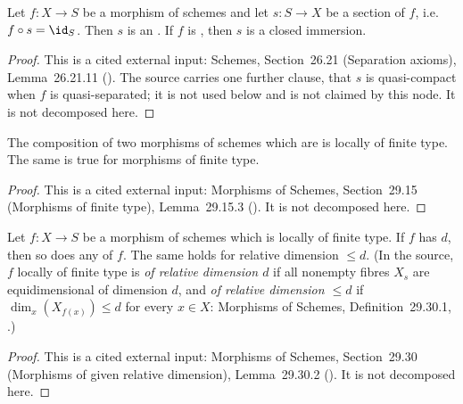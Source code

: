 \begin{lemma}
\label{lem:pc-section-closed-immersion}
Let $f:X\to S$ be a morphism of schemes and let $s:S\to X$ be a section
of $f$, i.e.\ $f\circ s=\id_S$.  Then $s$ is an
.  If $f$ is
, then $s$ is a closed
immersion.
\end{lemma}
\begin{proof}
This is a cited external input: Schemes, Section~26.21 (Separation
axioms), Lemma~26.21.11 ().  The source carries one
further clause, that $s$ is quasi-compact when $f$ is quasi-separated;
it is not used below and is not claimed by this node.  It is not
decomposed here.
\end{proof}

\begin{lemma}
\label{lem:pc-finite-type-composition}
The composition of two morphisms of schemes which are
 is locally of
finite type.  The same is true for morphisms of finite type.
\end{lemma}
\begin{proof}
This is a cited external input: Morphisms of Schemes, Section~29.15
(Morphisms of finite type), Lemma~29.15.3 ().  It is not
decomposed here.
\end{proof}

\begin{lemma}
\label{lem:pc-relative-dimension-base-change}
Let $f:X\to S$ be a morphism of schemes which is locally of finite type.  If $f$
has  $d$, then so does any
 of $f$.  The same holds for relative
dimension $\le d$.  (In the source, $f$ locally of finite type is \emph{of
relative dimension $d$} if all nonempty fibres $X_s$ are equidimensional of
dimension $d$, and \emph{of relative dimension $\le d$} if
$\dim_x(X_{f(x)})\le d$ for every $x\in X$: Morphisms of Schemes,
Definition~29.30.1, .)
\end{lemma}
\begin{proof}
This is a cited external input: Morphisms of Schemes, Section~29.30 (Morphisms of
given relative dimension), Lemma~29.30.2 ().  It is not
decomposed here.
\end{proof}

